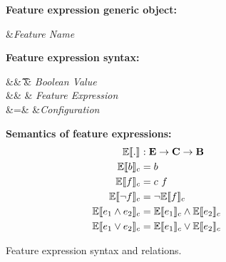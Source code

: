 \begin{figure}
\textbf{Feature expression generic object:}
\begin{syntax}
\synDef \fName \fSet &\textit{Feature Name}
\end{syntax}

\medskip
\textbf{Feature expression syntax:}
\begin{syntax}
\synDef \bTag \bSet &\eqq& \t \myOR \f & \textit{Boolean Value}\\
\synDef \dimMeta \ffSet &\eqq& \bTag \myOR \fName \myOR \neg \fName \myOR \dimMeta \wedge \dimMeta \myOR \dimMeta \vee \dimMeta & \textit{Feature Expression}\\
\synDef \config \confSet &=& \fSet \to \bSet &\textit{Configuration}
\end{syntax}



\medskip
\textbf{Semantics of feature expressions:}
\begin{alignat*}{1}
\fSem [] . &: \ffSet \to \confSet \to \bSet\\
\fSem \bTag &= \bTag\\
\fSem \fName &= \config \ \fName\\
\fSem {\neg \fName} &= \neg \fSem \fName\\
\fSem {\annd \dimMeta} &= \fSem {\dimMeta_1} \wedge \fSem {\dimMeta_2}\\
\fSem {\orr \dimMeta} &= \fSem {\dimMeta_1} \vee \fSem {\dimMeta_2}\\
\end{alignat*}

\begin{comment}
\medskip
\textbf{Configuration constraint:}
\begin{equation*}
\forall \overrightarrow{f_i} \in c :
\bigvee_{1\leq j \leq |f_i|}(\neg o_j \wedge \bigwedge_{\substack{k\not = j\\1 \leq k\leq |f_i|}} o_k)
= \prog{true}
\end{equation*}
\end{comment}

\caption{Feature expression syntax and relations.
}
\label{fig:fexp-def}
\end{figure}

